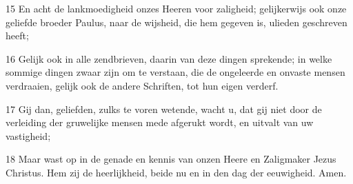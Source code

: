\par 15 En acht de lankmoedigheid onzes Heeren voor zaligheid; gelijkerwijs ook onze geliefde broeder Paulus, naar de wijsheid, die hem gegeven is, ulieden geschreven heeft;
\par 16 Gelijk ook in alle zendbrieven, daarin van deze dingen sprekende; in welke sommige dingen zwaar zijn om te verstaan, die de ongeleerde en onvaste mensen verdraaien, gelijk ook de andere Schriften, tot hun eigen verderf.
\par 17 Gij dan, geliefden, zulks te voren wetende, wacht u, dat gij niet door de verleiding der gruwelijke mensen mede afgerukt wordt, en uitvalt van uw vastigheid;
\par 18 Maar wast op in de genade en kennis van onzen Heere en Zaligmaker Jezus Christus. Hem zij de heerlijkheid, beide nu en in den dag der eeuwigheid. Amen.




